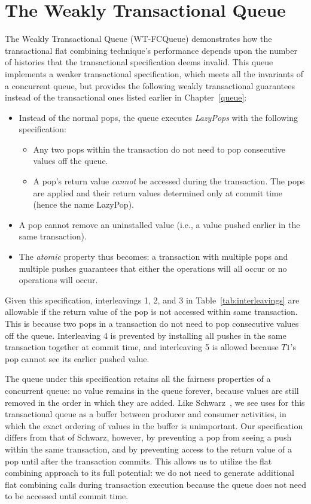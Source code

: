 \section{The Weakly Transactional Queue} 

The Weakly Transactional Queue (WT-FCQueue) demonstrates how the transactional flat combining technique's performance depends upon the number of histories that the transactional specification deems invalid. This queue implements a weaker transactional specification, which meets all the invariants of a concurrent queue, but provides the following weakly transactional guarantees instead of the transactional ones listed earlier in Chapter~\ref{queue}:
\begin{itemize}
    \item Instead of the normal pops, the queue executes \emph{LazyPops} with the following specification:
        \begin{itemize}
            \item Any two pops within the transaction do not need to pop consecutive values off the queue.
            \item A pop's return value \emph{cannot} be accessed during the transaction. The pops are applied and their return values determined only at commit time (hence the name LazyPop). 
        \end{itemize}
    \item A pop cannot remove an uninstalled value (i.e., a value pushed earlier in the same transaction).
    \item The \emph{atomic} property thus becomes: a transaction with multiple pops and multiple pushes guarantees that either the operations will all occur or no operations will occur.
\end{itemize}

Given this specification, interleavings 1, 2, and 3 in Table~\ref{tab:interleavings} are allowable if the return value of the pop is not accessed within same transaction. This is because two pops in a transaction do not need to pop consecutive values off the queue. Interleaving 4 is prevented by installing all pushes in the same transaction together at commit time, and interleaving 5 is allowed because $T1$'s pop cannot see its earlier pushed value.

The queue under this specification retains all the fairness properties of a concurrent queue: no value remains in the queue forever, because values are still removed in the order in which they are added. Like Schwarz~\cite{schwarz}, we see uses for this transactional queue as a buffer between producer and consumer activities, in which the exact ordering of values in the buffer is unimportant.
Our specification differs from that of Schwarz, however, by preventing a pop from seeing a push within the same transaction, and by preventing access to the return value of a pop until after the transaction commits. This allows us to utilize the flat combining approach to its full potential: we do not need to generate additional flat combining calls during transaction execution because the queue does not need to be accessed until commit time.

